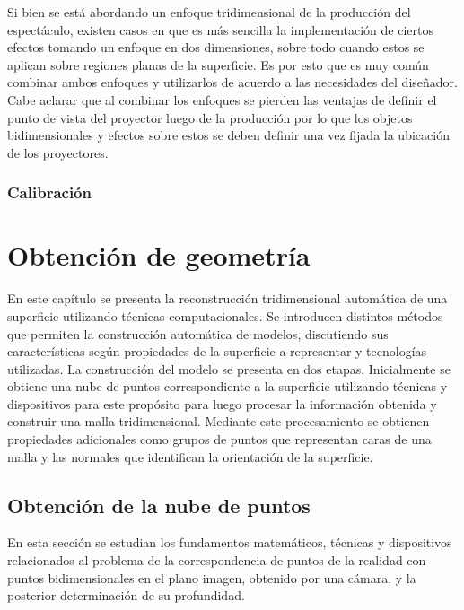 Si bien se está abordando un enfoque tridimensional de la producción del espectáculo, existen casos en que es más sencilla la implementación de ciertos efectos tomando un enfoque en dos dimensiones, sobre todo cuando estos se aplican sobre regiones planas de la superficie. Es por esto que es muy común combinar ambos enfoques y utilizarlos de acuerdo a las necesidades del diseñador. Cabe aclarar que al combinar los enfoques se pierden las ventajas de definir el punto de vista del proyector luego de la producción por lo que los objetos bidimensionales y efectos sobre estos se deben definir una vez fijada la ubicación de los proyectores.

\subsubsection{Calibración}


\section{Obtención de geometría}

En este capítulo se presenta la reconstrucción tridimensional automática de una superficie utilizando técnicas computacionales.
Se introducen distintos métodos que permiten la construcción automática de modelos, discutiendo sus características según propiedades de la superficie a representar y tecnologías utilizadas.
La construcción del modelo se presenta en dos etapas. Inicialmente se obtiene una nube de puntos correspondiente a la superficie utilizando técnicas y dispositivos para este propósito para luego procesar la información obtenida y construir una malla tridimensional. Mediante este procesamiento se obtienen propiedades adicionales como grupos de puntos que representan caras de una malla y las normales que identifican la orientación de la superficie.

\subsection{Obtención de la nube de puntos}

En esta sección se estudian los fundamentos matemáticos, técnicas y dispositivos relacionados al problema de la correspondencia de puntos de la realidad con puntos bidimensionales en el plano imagen, obtenido por una cámara, y la posterior determinación de su profundidad. 

